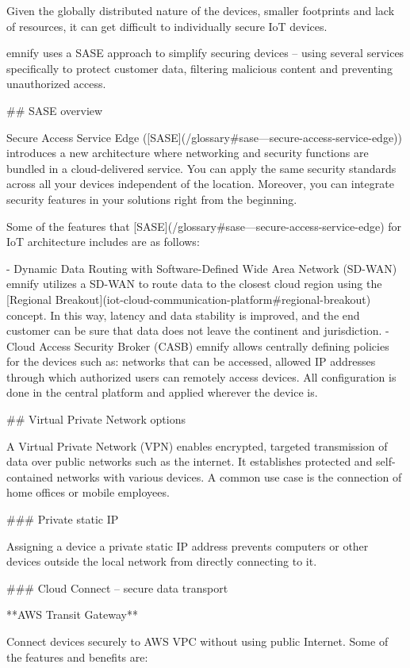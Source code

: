 \documentclass[11pt, oneside]{article}   	%
\newcommand{\addspace}{\vspace{2mm}}
\begin{document}
\begin{markdown}

Given the globally distributed nature of the devices, smaller footprints and lack of resources, it can get difficult to individually secure IoT devices.

emnify uses a SASE approach to simplify securing devices -- using several services specifically to protect customer data, filtering malicious content and preventing unauthorized access.

## SASE overview

Secure Access Service Edge ([SASE](/glossary#sase---secure-access-service-edge)) introduces a new architecture where networking and security functions are bundled in a cloud-delivered service.
You can apply the same security standards across all your devices independent of the location.
Moreover, you can integrate security features in your solutions right from the beginning.

Some of the features that [SASE](/glossary#sase---secure-access-service-edge) for IoT architecture includes are as follows:

\end{markdown}
\addspace
\begin{markdown}
- Dynamic Data Routing with Software-Defined Wide Area Network (SD-WAN)
emnify utilizes a SD-WAN to route data to the closest cloud region using the [Regional Breakout](iot-cloud-communication-platform#regional-breakout) concept.
In this way, latency and data stability is improved, and the end customer can be sure that data does not leave the continent and jurisdiction.
- Cloud Access Security Broker (CASB)
emnify allows centrally defining policies for the devices such as: networks that can be accessed, allowed IP addresses through which authorized users can remotely access devices.
All configuration is done in the central platform and applied wherever the device is.
\end{markdown}
\addspace
\begin{markdown}

## Virtual Private Network options

A Virtual Private Network (VPN) enables encrypted, targeted transmission of data over public networks such as the internet.
It establishes protected and self-contained networks with various devices.
A common use case is the connection of home offices or mobile employees.

### Private static IP

Assigning a device a private static IP address prevents computers or other devices outside the local network from directly connecting to it.

### Cloud Connect -- secure data transport

**AWS Transit Gateway**

Connect devices securely to AWS VPC without using public Internet.
Some of the features and benefits are:

\end{markdown}
\end{document}
